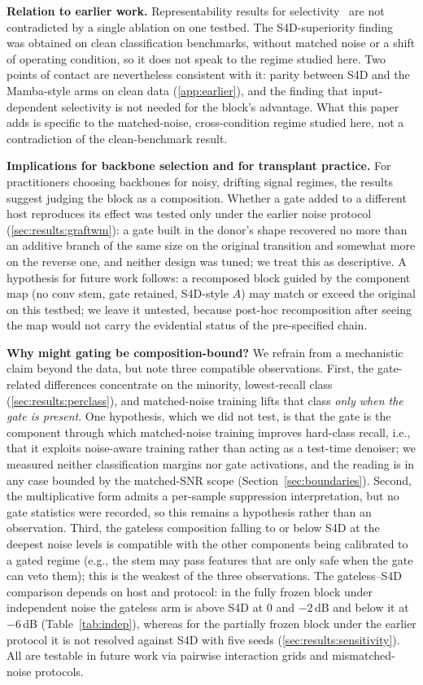 \textbf{Relation to earlier work.} Representability results for selectivity~\cite{huang2025selectivity} are not contradicted by a single ablation on one testbed. The S4D-superiority finding~\cite{saadatmand2026s4d} was obtained on clean classification benchmarks, without matched noise or a shift of operating condition, so it does not speak to the regime studied here. Two points of contact are nevertheless consistent with it: parity between S4D and the Mamba-style arms on clean data (\ref{app:earlier}), and the finding that input-dependent selectivity is not needed for the block's advantage. What this paper adds is specific to the matched-noise, cross-condition regime studied here, not a contradiction of the clean-benchmark result.

\textbf{Implications for backbone selection and for transplant practice.} For practitioners choosing backbones for noisy, drifting signal regimes, the results suggest judging the block as a composition. Whether a gate added to a different host reproduces its effect was tested only under the earlier noise protocol (\ref{sec:results:graftwm}): a gate built in the donor's shape recovered no more than an additive branch of the same size on the original transition and somewhat more on the reverse one, and neither design was tuned; we treat this as descriptive. A hypothesis for future work follows: a recomposed block guided by the component map (no conv stem, gate retained, S4D-style $A$) may match or exceed the original on this testbed; we leave it untested, because post-hoc recomposition after seeing the map would not carry the evidential status of the pre-specified chain.

\textbf{Why might gating be composition-bound?} We refrain from a mechanistic claim beyond the data, but note three compatible observations. First, the gate-related differences concentrate on the minority, lowest-recall class (\ref{sec:results:perclass}), and matched-noise training lifts that class \emph{only when the gate is present}. One hypothesis, which we did not test, is that the gate is the component through which matched-noise training improves hard-class recall, i.e., that it exploits noise-aware training rather than acting as a test-time denoiser; we measured neither classification margins nor gate activations, and the reading is in any case bounded by the matched-SNR scope (Section~\ref{sec:boundaries}). Second, the multiplicative form admits a per-sample suppression interpretation, but no gate statistics were recorded, so this remains a hypothesis rather than an observation. Third, the gateless composition falling to or below S4D at the deepest noise levels is compatible with the other components being calibrated to a gated regime (e.g., the stem may pass features that are only safe when the gate can veto them); this is the weakest of the three observations. The gateless--S4D comparison depends on host and protocol: in the fully frozen block under independent noise the gateless arm is above S4D at $0$ and $-2$\,dB and below it at $-6$\,dB (Table~\ref{tab:indep}), whereas for the partially frozen block under the earlier protocol it is not resolved against S4D with five seeds (\ref{sec:results:sensitivity}). All are testable in future work via pairwise interaction grids and mismatched-noise protocols.
